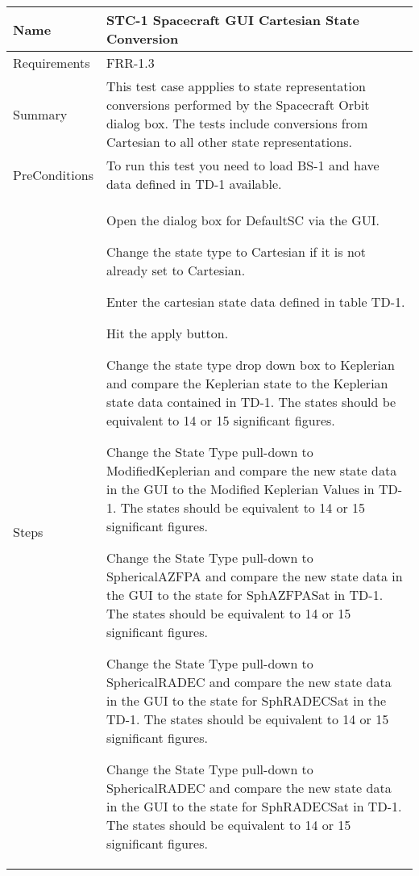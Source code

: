 

\begin{table}[htbp!]
\centering
      \begin{tabular}{|p{1.05 in} |p{4.75 in} |}
      \hline
         \rowcolor[rgb]{0.8,0.8,0.8} Name & STC-1 Spacecraft GUI Cartesian State Conversion\\
         \hline
         Requirements & FRR-1.3\\ \hline
         Summary &
         This test case appplies to state representation conversions performed by the Spacecraft Orbit dialog box.   The tests include conversions from Cartesian to all other state representations.\\
         \hline
         PreConditions & To run this test you need to load BS-1 and have data defined in TD-1 available.\\
         \hline
         Steps &
         \begin{compactenum}
         \item Open the dialog box for DefaultSC via the GUI.
         \item Change the state type to Cartesian if it is not already set to Cartesian.
         \item Enter the cartesian state data defined in table TD-1.
         \item Hit the apply button.
         \item Change the state type drop down box to Keplerian and compare the Keplerian state to the
         Keplerian state data contained in TD-1. The states should be equivalent to 14 or 15 significant figures.
         \item   Change the State Type pull-down to ModifiedKeplerian and compare the new state data in the GUI to
         the Modified Keplerian Values in TD-1.  The states should be equivalent to 14 or 15 significant figures.
         \item   Change the State Type pull-down to SphericalAZFPA and compare the new state data in the GUI to the state for SphAZFPASat in TD-1.  The states should be equivalent to 14 or 15 significant figures.
        \item    Change the State Type pull-down to SphericalRADEC and compare the new state data in the GUI to the state for SphRADECSat in the TD-1.  The states should be equivalent to 14 or 15 significant figures.
        \item    Change the State Type pull-down to SphericalRADEC and compare the new state data in the GUI to the state for SphRADECSat in TD-1.  The states should be equivalent to 14 or 15 significant figures.

\end{compactenum}
\end{tabular}
\end{table}
